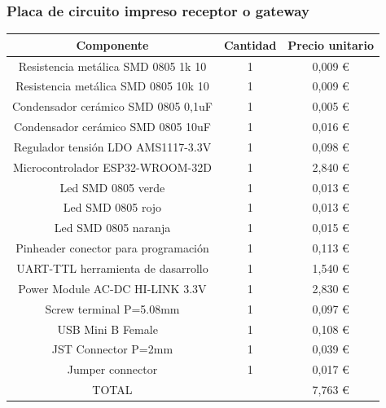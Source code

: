 \documentclass[paper=a4, fontsize=11pt,twoside]{scrartcl}	%
\begin{document}
            \subsubsection{Placa de circuito impreso receptor o gateway}
                \begin{center}
                    \begin{tabular}{||c | c |c ||} 
                    \hline
                    Componente & Cantidad & Precio unitario  \\ [0.5ex] 
                    \hline
                    Resistencia metálica SMD 0805 1k 10  	&1&	 0,009 € \\ 
                    Resistencia metálica SMD 0805 10k 10 	&1&	 0,009 € \\ 
                    Condensador cerámico SMD 0805 0,1uF  	&1&	 0,005 € \\ 
                    Condensador cerámico SMD 0805 10uF   	&1&	 0,016 € \\ 
                    Regulador tensión LDO AMS1117-3.3V   	&1&	 0,098 € \\ 
                    Microcontrolador ESP32-WROOM-32D     	&1&	 2,840 € \\ 
                    Led SMD 0805 verde                   	&1&	 0,013 € \\ 
                    Led SMD 0805 rojo                    	&1&	 0,013 € \\ 
                    Led SMD 0805 naranja                 	&1&	 0,015 € \\ 
                    Pinheader conector para programación 	&1&	 0,113 € \\ 
                    UART-TTL herramienta de dasarrollo   	&1&	 1,540 € \\ 
                    Power Module AC-DC HI-LINK 3.3V	        &1&	 2,830 € \\ 
                    Screw terminal P=5.08mm	                &1&	 0,097 € \\ 
                    USB Mini B Female                    	&1&	 0,108 € \\ 
                    JST Connector P=2mm                  	&1&	 0,039 € \\ 
                    Jumper connector	                    &1&	 0,017 € \\ 
                    \hline
                    TOTAL                    	            &&	 7,763 € \\ 
                    \end{tabular}
                \end{center}
\end{document}

